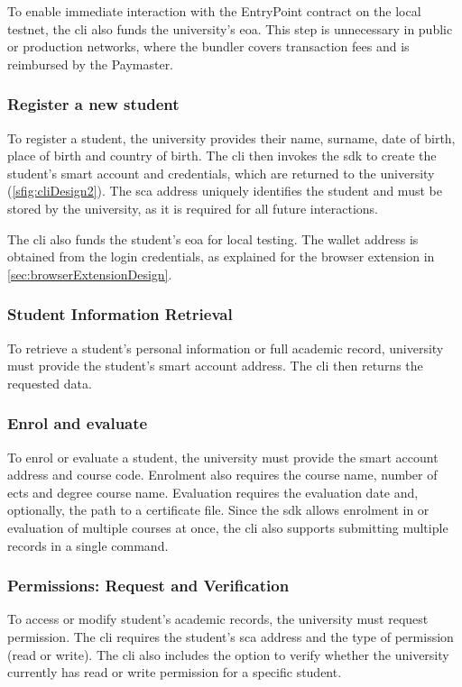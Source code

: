 To enable immediate interaction with the EntryPoint contract on the local testnet, the \gls{cli} also funds the university's \gls{eoa}. This step is unnecessary in public or production networks, where the bundler covers transaction fees and is reimbursed by the Paymaster.

\subsubsection{Register a new student}
To register a student, the  university provides their name, surname, date of birth, place of birth and country of birth. The \gls{cli} then invokes the \gls{sdk} to create the student's smart account and credentials, which are returned to the university (\cref{sfig:cliDesign2}). The \gls{sca} address uniquely identifies the student and must be stored by the university, as it is required for all future interactions. 

The \gls{cli} also funds the student's \gls{eoa} for local testing. The wallet address is obtained from the login credentials, as explained for the browser extension in \cref{sec:browserExtensionDesign}.

\subsubsection{Student Information Retrieval}
To retrieve a student's personal information or full academic record, university must provide the student's smart account address. The \gls{cli} then returns the requested data.

\subsubsection{Enrol and evaluate}
To enrol or evaluate a student, the university must provide the smart account address and course code. Enrolment also requires the course name, number of \gls{ects} and degree course name. Evaluation requires the evaluation date and, optionally, the path to a certificate file. Since the \gls{sdk} allows enrolment in or evaluation of multiple courses at once, the \gls{cli} also supports submitting multiple records in a single command.     

\subsubsection{Permissions: Request and Verification}
To access or modify student's academic records, the university must request permission. The \gls{cli} requires the student's \gls{sca} address and the type of permission (read or write).
The \gls{cli} also includes the option to verify whether the university currently has read or write permission for a specific student.

